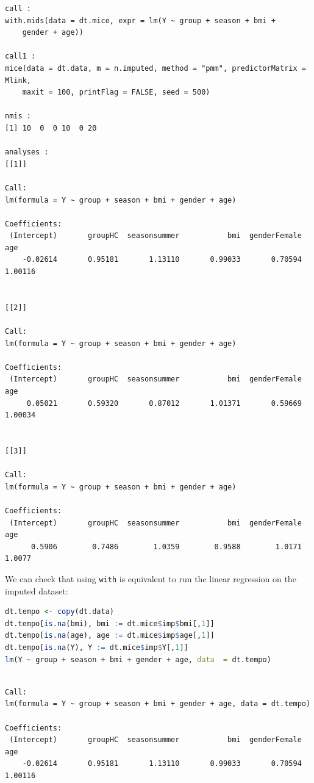\documentclass[12pt]{article}
\begin{document}
\label{}
\begin{verbatim}
call :
with.mids(data = dt.mice, expr = lm(Y ~ group + season + bmi + 
    gender + age))

call1 :
mice(data = dt.data, m = n.imputed, method = "pmm", predictorMatrix = Mlink, 
    maxit = 100, printFlag = FALSE, seed = 500)

nmis :
[1] 10  0  0 10  0 20

analyses :
[[1]]

Call:
lm(formula = Y ~ group + season + bmi + gender + age)

Coefficients:
 (Intercept)       groupHC  seasonsummer           bmi  genderFemale           age  
    -0.02614       0.95181       1.13110       0.99033       0.70594       1.00116  


[[2]]

Call:
lm(formula = Y ~ group + season + bmi + gender + age)

Coefficients:
 (Intercept)       groupHC  seasonsummer           bmi  genderFemale           age  
     0.05021       0.59320       0.87012       1.01371       0.59669       1.00034  


[[3]]

Call:
lm(formula = Y ~ group + season + bmi + gender + age)

Coefficients:
 (Intercept)       groupHC  seasonsummer           bmi  genderFemale           age  
      0.5906        0.7486        1.0359        0.9588        1.0171        1.0077
\end{verbatim}

We can check that using \texttt{with} is equivalent to run the linear
regression on the imputed dataset:
\begin{lstlisting}[language=r,numbers=none]
dt.tempo <- copy(dt.data)
dt.tempo[is.na(bmi), bmi := dt.mice$imp$bmi[,1]]
dt.tempo[is.na(age), age := dt.mice$imp$age[,1]]
dt.tempo[is.na(Y), Y := dt.mice$imp$Y[,1]]
lm(Y ~ group + season + bmi + gender + age, data  = dt.tempo)
\end{lstlisting}

\label{}
\begin{verbatim}

Call:
lm(formula = Y ~ group + season + bmi + gender + age, data = dt.tempo)

Coefficients:
 (Intercept)       groupHC  seasonsummer           bmi  genderFemale           age  
    -0.02614       0.95181       1.13110       0.99033       0.70594       1.00116
\end{verbatim}
\end{document}
